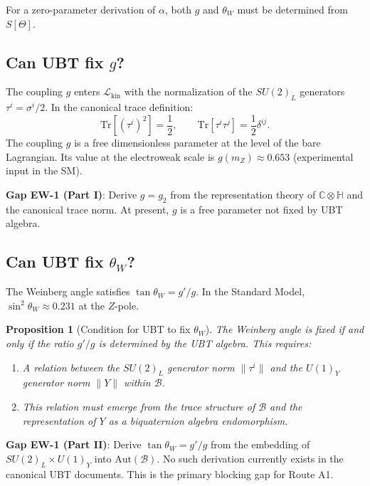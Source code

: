 \documentclass[12pt,a4paper]{article}
\newtheorem{proposition}[theorem]{Proposition}
\theoremstyle{definition}
\theoremstyle{remark}
\begin{document}
For a zero-parameter derivation of $\alpha$, both $g$ and $\theta_W$ must be
determined from $S[\Theta]$.

\subsection{Can UBT fix $g$?}

The coupling $g$ enters $\mathcal{L}_{\mathrm{kin}}$ with the normalization
of the $SU(2)_L$ generators $\tau^i = \sigma^i/2$.  In the canonical trace
definition:
\begin{equation}
  \mathrm{Tr}[(\tau^i)^2] = \frac{1}{2},
  \qquad
  \mathrm{Tr}[\tau^i \tau^j] = \frac{1}{2}\delta^{ij}.
\end{equation}
The coupling $g$ is a free dimensionless parameter at the level of the bare
Lagrangian.  Its value at the electroweak scale is $g(m_Z) \approx 0.653$
(experimental input in the SM).

\begin{gapbox}
\textbf{Gap EW-1 (Part I)}: Derive $g = g_2$ from the representation theory of
$\mathbb{C}\otimes\mathbb{H}$ and the canonical trace norm.
At present, $g$ is a free parameter not fixed by UBT algebra.
\end{gapbox}

\subsection{Can UBT fix $\theta_W$?}

The Weinberg angle satisfies $\tan\theta_W = g'/g$.  In the Standard Model,
$\sin^2\theta_W \approx 0.231$ at the $Z$-pole.

\begin{proposition}[Condition for UBT to fix $\theta_W$]
\label{prop:gn:thetaW}
The Weinberg angle is fixed if and only if the ratio $g'/g$ is determined
by the UBT algebra.  This requires:
\begin{enumerate}
  \item A relation between the $SU(2)_L$ generator norm $\|\tau^i\|$ and the
        $U(1)_Y$ generator norm $\|Y\|$ within $\mathcal{B}$.
  \item This relation must emerge from the trace structure of $\mathcal{B}$
        and the representation of $Y$ as a biquaternion algebra endomorphism.
\end{enumerate}
\end{proposition}

\begin{gapbox}
\textbf{Gap EW-1 (Part II)}: Derive $\tan\theta_W = g'/g$ from the embedding of
$SU(2)_L \times U(1)_Y$ into $\mathrm{Aut}(\mathcal{B})$.  No such derivation
currently exists in the canonical UBT documents.  This is the primary blocking
gap for Route A1.
\end{gapbox}
\end{document}
